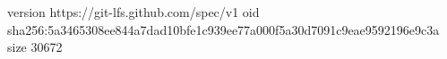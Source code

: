version https://git-lfs.github.com/spec/v1
oid sha256:5a3465308ee844a7dad10bfe1c939ee77a000f5a30d7091c9eae9592196e9c3a
size 30672
